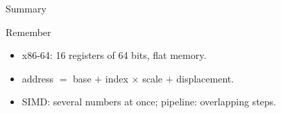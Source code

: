 \documentclass[aspectratio=169, 11pt, t, xcolor={table}]{beamer}
\begin{document}
\begin{frame}{Summary}
    \begin{tbox}{\faCheckCircle\quad Remember}
        \begin{itemize}
            \item x86-64: 16 registers of 64 bits, flat memory.
            \item address $=$ base $+$ index $\times$ scale $+$ displacement.
            \item SIMD: several numbers at once; pipeline: overlapping steps.
        \end{itemize}
    \end{tbox}
\end{frame}
\end{document}
